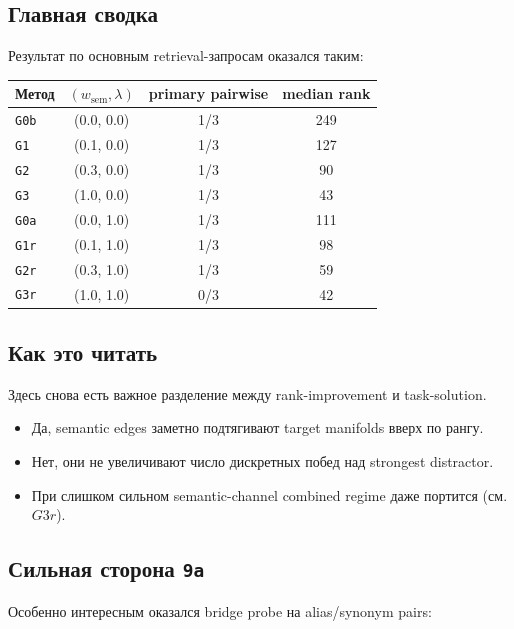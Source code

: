 \subsection{Главная сводка}

Результат по основным retrieval-запросам оказался таким:

\begin{center}
\begin{tabular}{lccc}
\toprule
Метод & \((w_{\mathrm{sem}}, \lambda)\) & primary pairwise & median rank \\
\midrule
\texttt{G0b} & (0.0, 0.0) & 1/3 & 249 \\
\texttt{G1} & (0.1, 0.0) & 1/3 & 127 \\
\texttt{G2} & (0.3, 0.0) & 1/3 & 90 \\
\texttt{G3} & (1.0, 0.0) & 1/3 & 43 \\
\texttt{G0a} & (0.0, 1.0) & 1/3 & 111 \\
\texttt{G1r} & (0.1, 1.0) & 1/3 & 98 \\
\texttt{G2r} & (0.3, 1.0) & 1/3 & 59 \\
\texttt{G3r} & (1.0, 1.0) & 0/3 & 42 \\
\bottomrule
\end{tabular}
\end{center}

\subsection{Как это читать}

Здесь снова есть важное разделение между rank-improvement и task-solution.

\begin{itemize}[leftmargin=2em]
\item Да, semantic edges заметно подтягивают target manifolds вверх по рангу.
\item Нет, они не увеличивают число дискретных побед над strongest distractor.
\item При слишком сильном semantic-channel combined regime даже портится
(см. \(G3r\)).
\end{itemize}

\subsection{Сильная сторона \texttt{9a}}

Особенно интересным оказался bridge probe на alias/synonym pairs:

